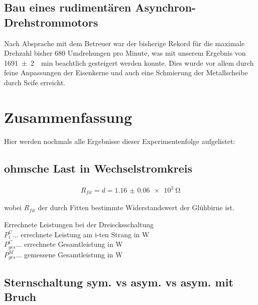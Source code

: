 \documentclass[12pt,english,ngerman]{scrartcl}
\begin{document}
\subsection{Bau eines rudimentären Asynchron-Drehstrommotors}

Nach Absprache mit dem Betreuer war der bisherige Rekord für die maximale
Drehzahl bisher 680 Umdrehungen pro Minute, was mit unserem Ergebnis von
\SI{1691(2)}{\per\minute} beachtlich gesteigert werden konnte. Dies wurde vor
allem durch feine Anpassungen der Eisenkerne und auch eine Schmierung der
Metallscheibe durch Seife erreicht.

\section{Zusammenfassung}\label{sec:zusammenfassung}

Hier werden nochmals alle Ergebnisse dieser Experimentenfolge aufgelistet:

\subsection{ohmsche Last in Wechselstromkreis}

\begin{align}
	R_{fit} = d = \SI{1.16(6)e3}{\ohm}
\end{align}

wobei $R_{fit}$ der durch Fitten bestimmte Widerstandswert der Glühbirne ist.

\begin{table}[H]
	\caption[Errechnete Leistungen bei der Dreiecksschaltung]{ Errechnete Leistungen bei der
		Dreiecksschaltung                                      \\
		$P_i^C \dots$ errechnete Leistung am i-ten Strang in W \\
		$P_{ges}^C \dots$ errechnete Gesamtleistung in W       \\
		$P_{ges}^M \dots$ gemessene Gesamtleistung in W
	}
	\centering
	
\end{table}

\subsection{Sternschaltung sym. vs asym. vs asym. mit Bruch}
\end{document}
